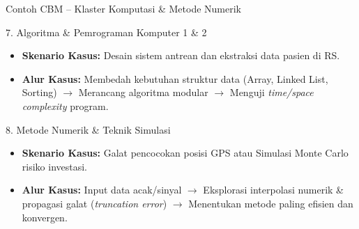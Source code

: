 \documentclass[aspectratio=169]{beamer} %
\begin{document}
\begin{frame}{Contoh CBM – Klaster Komputasi \& Metode Numerik}
    \begin{block}{7. Algoritma \& Pemrograman Komputer 1 \& 2}
        \begin{itemize}
            \item \textbf{Skenario Kasus:} Desain sistem antrean dan ekstraksi data pasien di RS.
            \item \textbf{Alur Kasus:} Membedah kebutuhan struktur data (Array, Linked List, Sorting) $\rightarrow$ Merancang algoritma modular $\rightarrow$ Menguji \textit{time/space complexity} program.
        \end{itemize}
    \end{block}

    \begin{block}{8. Metode Numerik \& Teknik Simulasi}
        \begin{itemize}
            \item \textbf{Skenario Kasus:} Galat pencocokan posisi GPS atau Simulasi Monte Carlo risiko investasi.
            \item \textbf{Alur Kasus:} Input data acak/sinyal $\rightarrow$ Eksplorasi interpolasi numerik \& propagasi galat (\textit{truncation error}) $\rightarrow$ Menentukan metode paling efisien dan konvergen.
        \end{itemize}
    \end{block}
\end{frame}
\end{document}
